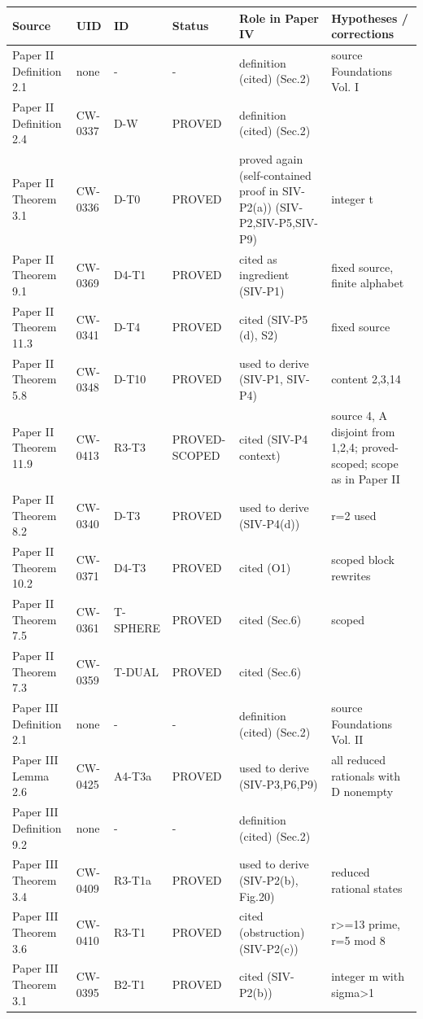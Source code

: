 {\scriptsize\setlength{\tabcolsep}{3pt}\begin{longtable}{@{}p{2.9cm}p{1.5cm}p{1.2cm}p{3.1cm}p{3.1cm}p{2.2cm}@{}}\toprule
Source & UID & ID & Status & Role in Paper IV & Hypotheses / corrections\\\midrule\endhead
Paper II Definition 2.1 & none & - & - & definition (cited) (Sec.2) & source Foundations Vol. I\\
Paper II Definition 2.4 & CW-0337 & D-W & PROVED & definition (cited) (Sec.2) & \\
Paper II Theorem 3.1 & CW-0336 & D-T0 & PROVED & proved again (self-contained proof in SIV-P2(a)) (SIV-P2,SIV-P5,SIV-P9) & integer t\\
Paper II Theorem 9.1 & CW-0369 & D4-T1 & PROVED & cited as ingredient (SIV-P1) & fixed source, finite alphabet\\
Paper II Theorem 11.3 & CW-0341 & D-T4 & PROVED & cited (SIV-P5 (d), S2) & fixed source\\
Paper II Theorem 5.8 & CW-0348 & D-T10 & PROVED & used to derive (SIV-P1, SIV-P4) & content {2,3,14}\\
Paper II Theorem 11.9 & CW-0413 & R3-T3 & PROVED-SCOPED & cited (SIV-P4 context) & source 4, A disjoint from {1,2,4}; proved-scoped; scope as in Paper II\\
Paper II Theorem 8.2 & CW-0340 & D-T3 & PROVED & used to derive (SIV-P4(d)) & r=2 used\\
Paper II Theorem 10.2 & CW-0371 & D4-T3 & PROVED & cited (O1) & scoped block rewrites\\
Paper II Theorem 7.5 & CW-0361 & T-SPHERE & PROVED & cited (Sec.6) & scoped\\
Paper II Theorem 7.3 & CW-0359 & T-DUAL & PROVED & cited (Sec.6) & \\
Paper III Definition 2.1 & none & - & - & definition (cited) (Sec.2) & source Foundations Vol. II\\
Paper III Lemma 2.6 & CW-0425 & A4-T3a & PROVED & used to derive (SIV-P3,P6,P9) & all reduced rationals with D nonempty\\
Paper III Definition 9.2 & none & - & - & definition (cited) (Sec.2) & \\
Paper III Theorem 3.4 & CW-0409 & R3-T1a & PROVED & used to derive (SIV-P2(b), Fig.20) & reduced rational states\\
Paper III Theorem 3.6 & CW-0410 & R3-T1 & PROVED & cited (obstruction) (SIV-P2(c)) & r>=13 prime, r=5 mod 8\\
Paper III Theorem 3.1 & CW-0395 & B2-T1 & PROVED & cited (SIV-P2(b)) & integer m with sigma>1\\

\end{longtable}}
